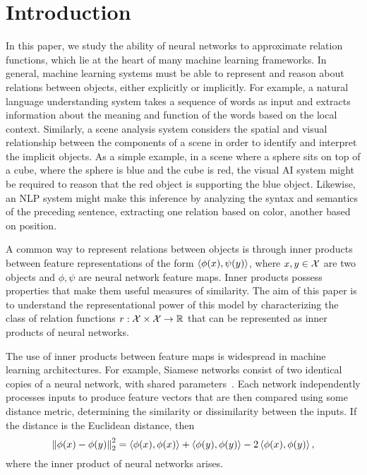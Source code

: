 \section{Introduction}\label{sec:intro}


In this paper, we study the ability of neural networks to approximate relation functions, which lie at the heart of many machine learning frameworks. In general, machine learning systems must be able to represent and reason about relations between objects, either explicitly or implicitly. For example, a natural language understanding system takes a sequence of words as input and extracts information about the meaning and function of the words based on the local context. Similarly, a scene analysis system considers the spatial and visual relationship between the components of a scene in order to identify and interpret the implicit objects. As a simple example, in a scene where a sphere sits on top of a cube, where the sphere is blue and the cube is red, the visual AI system might be required to reason that the red object is supporting the blue object. Likewise, an NLP system might make this inference by analyzing the syntax and semantics of the preceding sentence, extracting one relation based on color, another based on position.

A common way to represent relations between objects is through inner products between feature representations of the form $\left \langle \phi(x), \psi(y) \right\rangle$, where $x, y \in {\mathcal{X}}$ are two objects and $\phi, \psi$ are neural network feature maps. Inner products possess properties that make them useful measures of similarity. The aim of this paper is to understand the representational power of this model by characterizing the class of relation functions $r: {\mathcal{X}} \times {\mathcal{X}} \to \mathbb{R}$ that can be represented as inner products of neural networks.

The use of inner products between feature maps is widespread in machine learning architectures. 
For example, Siamese networks consist of two identical copies of a neural network, with shared parameters~\parencite{rumelhartLearningRepresentationsBackpropagating1986,langTimedelayNeuralNetwork1988,bromleySignatureVerificationUsing1993,baldiNeuralNetworksFingerprint1993,chopraLearningSimilarityMetric2005,kochSiameseNeuralNetworks2015}. Each network independently processes inputs to produce feature vectors that are then compared using some distance metric, determining the similarity or dissimilarity between the inputs. If the distance is the Euclidean distance, then 
$$\left\lVert\phi(x) - \phi(y)\right\rVert_{2}^2 = \left \langle \phi(x), \phi(x) \right\rangle + \left \langle \phi(y), \phi(y) \right\rangle - 2 \left \langle \phi(x), \phi(y) \right\rangle,$$ 
where the inner product of neural networks arises.

